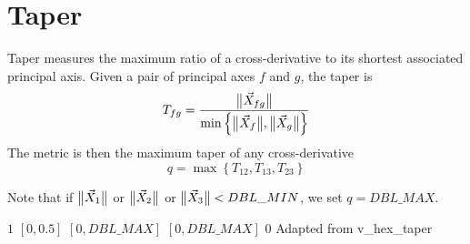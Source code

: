 \section{Taper\label{s:hex-taper}}

Taper measures the maximum ratio of a cross-derivative to its shortest associated principal axis.
Given a pair of principal axes $f$ and $g$, the taper is
\[
  T_{fg} = \frac{\big\lVert{\vec X_{fg}}\big\rVert}{\min\left\{\big\lVert{\vec X_f}\big\rVert,\big\lVert{\vec X_g}\big\rVert\right\}}
\]
The metric is then the maximum taper of any cross-derivative
\[
  q = \max\left\{ T_{12}, T_{13}, T_{23} \right\}
\]

Note that if $\big\lVert{\vec X_1}\big\rVert$ or $\big\lVert{\vec X_2}\big\rVert$ or $\big\lVert{\vec X_3}\big\rVert < DBL\_MIN$, we set $q = DBL\_MAX$.

%
{$1$}%
{$[0,0.5]$}%
{$[0,DBL\_MAX]$}%
{$[0,DBL\_MAX]$}%
{$0$}%
{Adapted from \cite{tf:89}}%
{v\_hex\_taper}%
